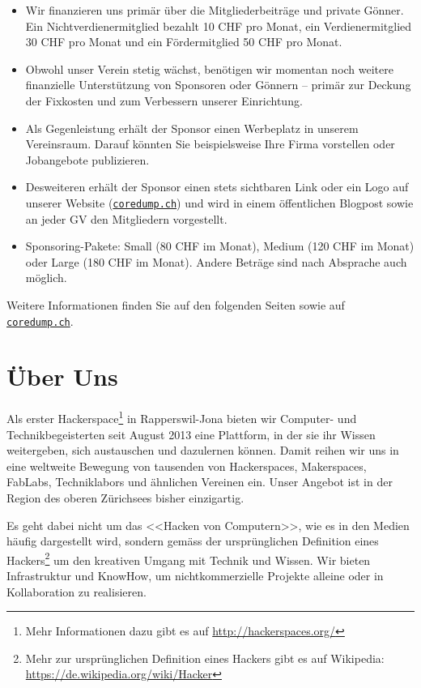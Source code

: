 \documentclass[10pt,a4paper,parskip,fleqn]{scrartcl}
\begin{document}
\begin{itemize}
	\item Wir finanzieren uns primär über die Mitgliederbeiträge und private
		Gönner. Ein Nichtverdienermitglied bezahlt 10 CHF pro Monat, ein
		Verdienermitglied 30 CHF pro Monat und ein Fördermitglied 50 CHF pro Monat.
	\item Obwohl unser Verein stetig wächst, benötigen wir momentan noch weitere
		finanzielle Unterstützung von Sponsoren oder Gönnern -- primär zur Deckung
		der Fixkosten und zum Verbessern unserer Einrichtung.
	\item Als Gegenleistung erhält der Sponsor einen Werbeplatz in unserem
		Vereinsraum. Darauf könnten Sie beispielsweise Ihre Firma vorstellen oder
		Jobangebote publizieren.
	\item Desweiteren erhält der Sponsor einen stets sichtbaren Link oder ein Logo
		auf unserer Website (\href{https://www.coredump.ch/}{\texttt{coredump.ch}})
		und wird in einem öffentlichen Blogpost sowie an jeder GV den Mitgliedern
		vorgestellt.
	\item Sponsoring-Pakete: Small (80 CHF im Monat), Medium (120 CHF im Monat)
		oder Large (180 CHF im Monat). Andere Beträge sind nach Absprache auch
		möglich.
\end{itemize}

Weitere Informationen finden Sie auf den folgenden Seiten sowie auf
\href{https://www.coredump.ch/}{\texttt{coredump.ch}}.

\newpage

\section{Über Uns}

Als erster Hackerspace\footnote{Mehr Informationen dazu gibt es auf
\url{http://hackerspaces.org/}} in Rapperswil-Jona bieten wir Computer- und
Technikbegeisterten seit August 2013 eine Plattform, in der sie ihr Wissen
weitergeben, sich austauschen und dazulernen können. Damit reihen wir uns in
eine weltweite Bewegung von tausenden von Hackerspaces, Makerspaces, FabLabs,
Techniklabors und ähnlichen Vereinen ein. Unser Angebot ist in der Region des
oberen Zürichsees bisher einzigartig.

Es geht dabei nicht um das <<Hacken von Computern>>, wie es in den Medien häufig
dargestellt wird, sondern gemäss der ursprünglichen Definition eines
Hackers\footnote{Mehr zur ursprünglichen Definition eines Hackers gibt es auf
Wikipedia: \url{https://de.wikipedia.org/wiki/Hacker}} um den kreativen Umgang
mit Technik und Wissen. Wir bieten Infrastruktur und KnowHow, um
nichtkommerzielle Projekte alleine oder in Kollaboration zu realisieren.
\end{document}
